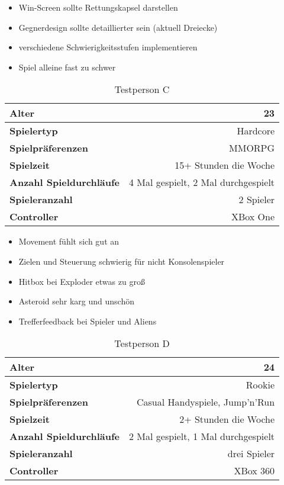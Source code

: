 \documentclass[11pt]{scrartcl}
\begin{document}
\begin{itemize}
\setlength{\parskip}{0pt}
\item Win-Screen sollte Rettungskapsel darstellen
\item Gegnerdesign sollte detaillierter sein (aktuell Dreiecke)
\item verschiedene Schwierigkeitsstufen implementieren
\item Spiel alleine fast zu schwer
\end{itemize}

\begin{table}[htp]
\centering
\begin{tabular}{|l|r|}
\hline
\textbf{Alter} &23\\
\hline
\textbf{Spielertyp} &Hardcore\\
\hline
\textbf{Spielpräferenzen} &MMORPG\\
\hline
\textbf{Spielzeit} &15+ Stunden die Woche\\
\hline
\textbf{Anzahl Spieldurchläufe} &4 Mal gespielt, 2 Mal durchgespielt\\
\hline
\textbf{Spieleranzahl} &2 Spieler\\
\hline
\textbf{Controller} &XBox One\\
\hline
\end{tabular}
\caption{Testperson C}
\label{tab:test-c}
\end{table}

\begin{itemize}
\setlength{\parskip}{0pt}
\item Movement fühlt sich gut an
\item Zielen und Steuerung schwierig für nicht Konsolenspieler
\item Hitbox bei Exploder etwas zu groß
\item Asteroid sehr karg und unschön
\item Trefferfeedback bei Spieler und Aliens
\end{itemize}

\begin{table}[htp]
\centering
\begin{tabular}{|l|r|}
\hline
\textbf{Alter} &24\\
\hline
\textbf{Spielertyp} &Rookie\\
\hline
\textbf{Spielpräferenzen} &Casual Handyspiele, Jump'n'Run\\
\hline
\textbf{Spielzeit} &2+ Stunden die Woche\\
\hline
\textbf{Anzahl Spieldurchläufe} &2 Mal gespielt, 1 Mal durchgespielt\\
\hline
\textbf{Spieleranzahl} &drei Spieler\\
\hline
\textbf{Controller} &XBox 360\\
\hline
\end{tabular}
\caption{Testperson D}
\label{tab:test-d}
\end{table}
\end{document}
